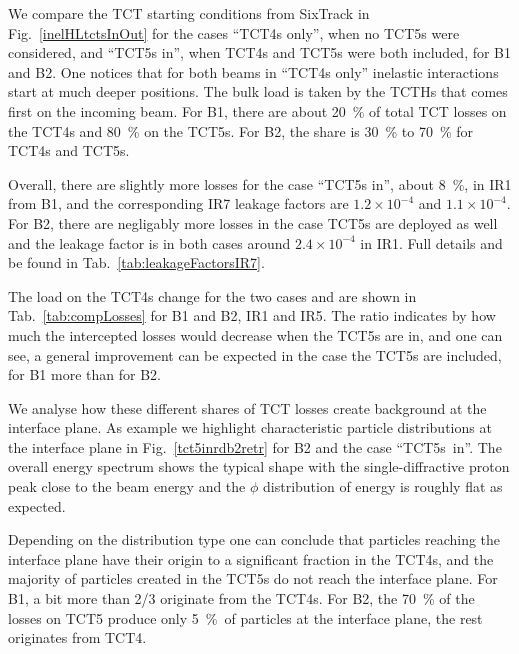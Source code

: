 We compare the TCT starting conditions from SixTrack in Fig.~\ref{inelHLtctsInOut} for the cases ``TCT4s only'', when no TCT5s were considered, and ``TCT5s in'', when TCT4s and TCT5s were both included, for B1 and B2. One notices that for both beams in ``TCT4s only'' inelastic interactions start at much deeper positions. The bulk load is taken by the TCTHs that comes first on the incoming beam. For B1, there are about 20~\% of total TCT losses on the TCT4s and 80~\% on the TCT5s. For B2, the share is 30~\% to 70~\% for TCT4s and TCT5s.

Overall, there are slightly more losses for the case ``TCT5s in'', about 8~\%, in IR1 from B1, and the corresponding IR7 leakage factors are $1.2 \times 10^{-4}$ and $1.1 \times 10^{-4}$. For B2, there are negligably more losses in the case TCT5s are deployed as well and the leakage factor is in both cases around $2.4 \times 10^{-4}$ in IR1. Full details and be found in Tab.~\ref{tab:leakageFactorsIR7}.

The load on the TCT4s change for the two cases and are shown in Tab.~\ref{tab:compLosses} for B1 and B2, IR1 and IR5. The ratio indicates by how much the intercepted losses would decrease when the TCT5s are in, and one can see, a general improvement can be expected in the case the TCT5s are included, for B1 more than for B2.

We analyse how these different shares of TCT losses create background at the interface plane. As example we highlight characteristic particle distributions at the interface plane in Fig.~\ref{tct5inrdb2retr} for B2 and the case ``TCT5s~in''. The overall energy spectrum shows the typical shape with the single-diffractive proton peak close to the beam energy and the $\phi$ distribution of energy is roughly flat as expected.

Depending on the distribution type one can conclude that particles reaching the interface plane have their origin to a significant fraction in the TCT4s, and the majority of particles created in the TCT5s do not reach the interface plane. For B1, a bit more than 2/3 originate from the TCT4s. For B2, the 70~\% of the losses on TCT5 produce only 5~\%~of particles at the interface plane, the rest originates from TCT4. 

